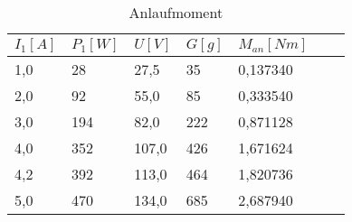 \begin{table}[htbp]
    \centering
    \begin{tabularx}{\columnwidth}{XXXXXXX}
    \toprule
     $I_1[A]$ &  $P_1[W]$ &  $U[V]$ &  $G[g]$ &  $M_{an}[Nm]$ \\
    \midrule
            1,0 &          28 &      27,5 &        35 &        0,137340 \\
            2,0 &          92 &      55,0 &        85 &        0,333540 \\
            3,0 &         194 &      82,0 &       222 &        0,871128 \\
            4,0 &         352 &     107,0 &       426 &        1,671624 \\
            4,2 &         392 &     113,0 &       464 &        1,820736 \\
            5,0 &         470 &     134,0 &       685 &        2,687940 \\
    \bottomrule
    \end{tabularx}
    \caption{Anlaufmoment}
\end{table}
